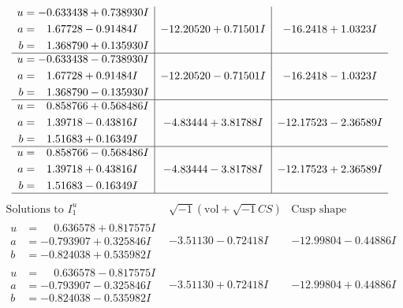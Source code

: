 \documentclass[1p]{elsarticle_modified}
\theoremstyle{definition}
\newcommand{\I}{\sqrt{-1}}
\begin{document}
$$\begin{array}{c|c|c}
\begin{aligned}
u &= -0.633438 + 0.738930 I \\
a &= \phantom{-}1.67728 - 0.91484 I \\
b &= \phantom{-}1.368790 + 0.135930 I\end{aligned}
 & -12.20520 + 0.71501 I & -16.2418 + 1.0323 I \\ \hline\begin{aligned}
u &= -0.633438 - 0.738930 I \\
a &= \phantom{-}1.67728 + 0.91484 I \\
b &= \phantom{-}1.368790 - 0.135930 I\end{aligned}
 & -12.20520 - 0.71501 I & -16.2418 - 1.0323 I \\ \hline\begin{aligned}
u &= \phantom{-}0.858766 + 0.568486 I \\
a &= \phantom{-}1.39718 - 0.43816 I \\
b &= \phantom{-}1.51683 + 0.16349 I\end{aligned}
 & -4.83444 + 3.81788 I & -12.17523 - 2.36589 I \\ \hline\begin{aligned}
u &= \phantom{-}0.858766 - 0.568486 I \\
a &= \phantom{-}1.39718 + 0.43816 I \\
b &= \phantom{-}1.51683 - 0.16349 I\end{aligned}
 & -4.83444 - 3.81788 I & -12.17523 + 2.36589 I\\
 \hline 
 \end{array}$$\newpage$$\begin{array}{c|c|c}  
\text{Solutions to }I^u_{1}& \I (\text{vol} + \sqrt{-1}CS) & \text{Cusp shape}\\
 \hline 
\begin{aligned}
u &= \phantom{-}0.636578 + 0.817575 I \\
a &= -0.793907 + 0.325846 I \\
b &= -0.824038 + 0.535982 I\end{aligned}
 & -3.51130 - 0.72418 I & -12.99804 - 0.44886 I \\ \hline\begin{aligned}
u &= \phantom{-}0.636578 - 0.817575 I \\
a &= -0.793907 - 0.325846 I \\
b &= -0.824038 - 0.535982 I\end{aligned}
 & -3.51130 + 0.72418 I & -12.99804 + 0.44886 I \\ \hline\begin{aligned}

\end{aligned}
\end{array}$$
\end{document}
